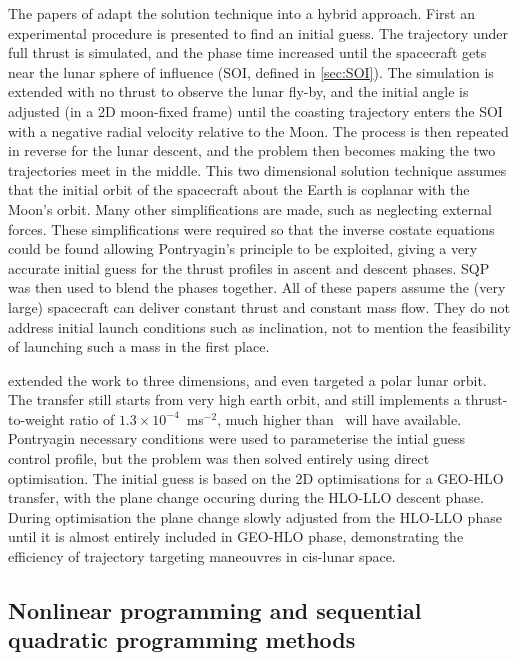 The papers of \textcite{Kluever1995, Kluever1996} adapt the solution technique into a hybrid approach. First an experimental procedure is presented to find an initial guess. The trajectory under full thrust is simulated, and the phase time increased until the spacecraft gets near the lunar sphere of influence (SOI, defined in \autoref{sec:SOI}). The simulation is extended with no thrust to observe the lunar fly-by, and the initial angle is adjusted (in a 2D moon-fixed frame) until the coasting trajectory enters the SOI with a negative radial velocity relative to the Moon. The process is then repeated in reverse for the lunar descent, and the problem then becomes making the two trajectories meet in the middle. This two dimensional solution technique assumes that the initial orbit of the spacecraft about the Earth is coplanar with the Moon's orbit. Many other simplifications are made, such as neglecting external forces. These simplifications were required so that the inverse costate equations could be found allowing Pontryagin's principle to be exploited, giving a very accurate initial guess for the thrust profiles in ascent and descent phases. SQP was then used to blend the phases together. All of these papers assume the (very large) spacecraft can deliver constant thrust and constant mass flow. They do not address initial launch conditions such as inclination, not to mention the feasibility of launching such a mass in the first place.

\textcite{Kluever1997} extended the work to three dimensions, and even targeted a polar lunar orbit. The transfer still starts from very high earth orbit, and still implements a thrust-to-weight ratio of $1.3\times10^{-4}$~ms$^{-2}$, much higher than \BW\ will have available. Pontryagin necessary conditions were used to parameterise the intial guess control profile, but the problem was then solved entirely using direct optimisation. The initial guess is based on the 2D optimisations for a GEO-HLO transfer, with the plane change occuring during the HLO-LLO descent phase. During optimisation the plane change slowly adjusted from the HLO-LLO phase until it is almost entirely included in GEO-HLO phase, demonstrating the efficiency of trajectory targeting maneouvres in cis-lunar space.





\subsection{Nonlinear programming and sequential quadratic programming methods} \label{sub:NLP-lit}

